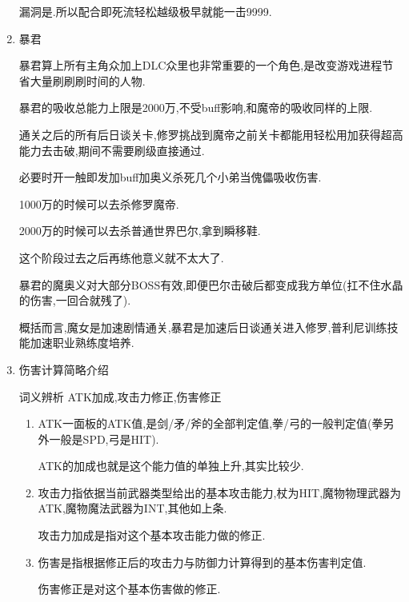 \begin{enumerate}
	漏洞是{\color{red}{练武5吃即死}}.所以配合即死流轻松越级极早就能一击9999.

	\item{暴君}

	暴君算上所有主角众加上DLC众里也非常重要的一个角色,是改变游戏进程节省大量刷刷刷时间的人物.

	暴君的吸收总能力上限是2000万,不受buff影响,和魔帝的吸收同样的上限.

	通关之后的所有后日谈关卡,修罗挑战到魔帝之前关卡都能用轻松用{\color{red}{即死流}}加{\color{red}{暴君吸收}}获得超高能力去击破,期间不需要刷级直接通过.

	必要时开一触即发加buff加奥义杀死几个小弟当傀儡吸收伤害.

	1000万的时候可以去杀修罗魔帝.

	2000万的时候可以去杀普通世界巴尔,拿到瞬移鞋.

	这个阶段过去之后再练他意义就不太大了.

	暴君的魔奥义对大部分BOSS有效,即便巴尔击破后都变成我方单位(扛不住水晶的伤害,一回合就残了).

	概括而言,魔女是加速剧情通关,暴君是加速后日谈通关进入修罗,普利尼训练技能加速职业熟练度培养.


	\item{伤害计算简略介绍}

	词义辨析 ATK加成,攻击力修正,伤害修正
	
	\begin{enumerate}
		\item  
		ATK一面板的ATK值,是剑/矛/斧的全部判定值,拳/弓的一般判定值(拳另外一般是SPD,弓是HIT).

		ATK的加成也就是这个能力值的单独上升,其实比较少.
		\item
		攻击力指依据当前武器类型给出的基本攻击能力,杖为HIT,魔物物理武器为ATK,魔物魔法武器为INT,其他如上条.

		攻击力加成是指对这个基本攻击能力做的修正.

		\item
		伤害是指根据修正后的攻击力与防御力计算得到的基本伤害判定值.

		伤害修正是对这个基本伤害做的修正.
	\end{enumerate}



\end{enumerate}

\newpage


